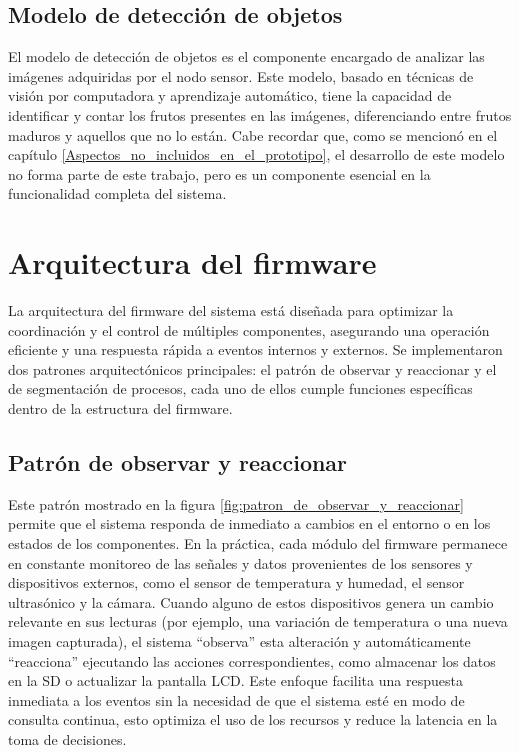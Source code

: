 \subsection{Modelo de detección de objetos}

El modelo de detección de objetos es el componente encargado de analizar las imágenes adquiridas por el nodo sensor. Este modelo, basado en técnicas de visión por computadora y aprendizaje automático, tiene la capacidad de identificar y contar los frutos presentes en las imágenes, diferenciando entre frutos maduros y aquellos que no lo están. Cabe recordar que, como se mencionó en el capítulo \ref{Aspectos_no_incluidos_en_el_prototipo}, el desarrollo de este modelo no forma parte de este trabajo, pero es un componente esencial en la funcionalidad completa del sistema. 

\newpage

\section{Arquitectura del firmware}

La arquitectura del firmware del sistema está diseñada para optimizar la coordinación y el control de múltiples componentes, asegurando una operación eficiente y una respuesta rápida a eventos internos y externos. Se implementaron dos patrones arquitectónicos principales: el patrón de observar y reaccionar y el de segmentación de procesos, cada uno de ellos cumple funciones específicas dentro de la estructura del firmware.

\subsection{Patrón de observar y reaccionar}

Este patrón mostrado en la figura \ref{fig:patron_de_observar_y_reaccionar} permite que el sistema responda de inmediato a cambios en el entorno o en los estados de los componentes. En la práctica, cada módulo del firmware permanece en constante monitoreo de las señales y datos provenientes de los sensores y dispositivos externos, como el sensor de temperatura y humedad, el sensor ultrasónico y la cámara. Cuando alguno de estos dispositivos genera un cambio relevante en sus lecturas (por ejemplo, una variación de temperatura o una nueva imagen capturada), el sistema ``observa'' esta alteración y automáticamente ``reacciona'' ejecutando las acciones correspondientes, como almacenar los datos en la SD o actualizar la pantalla LCD. Este enfoque facilita una respuesta inmediata a los eventos sin la necesidad de que el sistema esté en modo de consulta continua, esto optimiza el uso de los recursos y reduce la latencia en la toma de decisiones.

